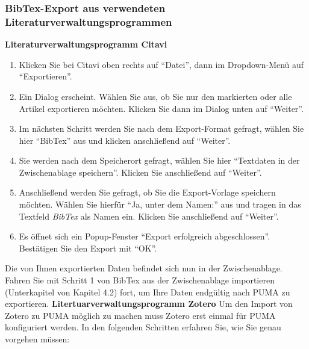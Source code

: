 \subsubsection{BibTex-Export aus verwendeten Literaturverwaltungsprogrammen}
\textbf{Literaturverwaltungsprogramm Citavi} 
\begin{enumerate}
    \item Klicken Sie bei Citavi oben rechts auf \enquote{Datei}, dann im Dropdown-Menü auf \enquote{Exportieren}.
    \item Ein Dialog erscheint. Wählen Sie aus, ob Sie nur den markierten oder alle Artikel exportieren möchten. Klicken Sie dann im Dialog unten auf \enquote{Weiter}.
    \item Im nächsten Schritt werden Sie nach dem Export-Format gefragt, wählen Sie hier \enquote{BibTex} aus und klicken anschließend auf \enquote{Weiter}.
    \item Sie werden nach dem Speicherort gefragt, wählen Sie hier \enquote{Textdaten in der Zwischenablage speichern}. Klicken Sie anschließend auf \enquote{Weiter}.
    \item Anschließend werden Sie gefragt, ob Sie die Export-Vorlage speichern möchten. Wählen Sie hierfür \enquote{Ja, unter dem Namen:} aus und tragen in das Textfeld \textit{BibTex} als Namen ein. Klicken Sie anschließend auf \enquote{Weiter}.%
    \item Es öffnet sich ein Popup-Fenster \enquote{Export erfolgreich abgeschlossen}. Bestätigen Sie den Export mit \enquote{OK}.
\end{enumerate}
Die von Ihnen exportierten Daten befindet sich nun in der Zwischenablage. Fahren Sie mit Schritt 1 von BibTex aus der Zwischenablage importieren (Unterkapitel von Kapitel 4.2) fort, um Ihre Daten endgültig nach PUMA zu exportieren.\newline
\newline
\textbf{Litertuarverwaltungsprogramm Zotero} 
\newline \newline
Um den Import von Zotero zu PUMA möglich zu machen muss Zotero erst einmal für PUMA konfiguriert werden. In den folgenden Schritten erfahren Sie, wie Sie genau vorgehen müssen:
